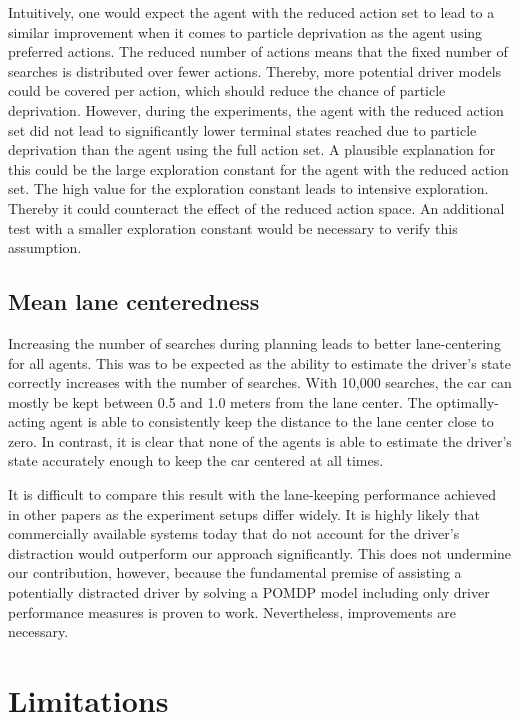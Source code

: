 Intuitively, one would expect the agent with the reduced action set to lead to a similar improvement when it comes to particle deprivation as the agent using preferred actions. The reduced number of actions means that the fixed number of searches is distributed over fewer actions. Thereby, more potential driver models could be covered per action, which should reduce the chance of particle deprivation. However, during the experiments, the agent with the reduced action set did not lead to significantly lower terminal states reached due to particle deprivation than the agent using the full action set. A plausible explanation for this could be the large exploration constant for the agent with the reduced action set. The high value for the exploration constant leads to intensive exploration. Thereby it could counteract the effect of the reduced action space. An additional test with a smaller exploration constant would be necessary to verify this assumption.

\subsection{Mean lane centeredness}

Increasing the number of searches during planning leads to better lane-centering for all agents. This was to be expected as the ability to estimate the driver's state correctly increases with the number of searches. With 10,000 searches, the car can mostly be kept between 0.5 and 1.0 meters from the lane center. The optimally-acting agent is able to consistently keep the distance to the lane center close to zero. In contrast, it is clear that none of the agents is able to estimate the driver's state accurately enough to keep the car centered at all times.

It is difficult to compare this result with the lane-keeping performance achieved in other papers as the experiment setups differ widely. It is highly likely that commercially available systems today that do not account for the driver's distraction would outperform our approach significantly. This does not undermine our contribution, however, because the fundamental premise of assisting a potentially distracted driver by solving a POMDP model including only driver performance measures is proven to work. Nevertheless, improvements are necessary.

\section{Limitations}
\label{sec:limitations}

